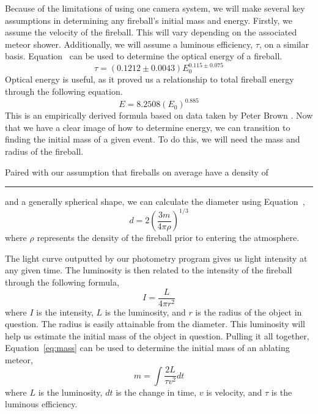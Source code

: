 Because of the limitations of using one camera system, we will make several key assumptions in determining any fireball's initial mass and energy.  
Firstly, we assume the velocity of the fireball.
This will vary depending on the associated meteor shower.
Additionally, we will assume a luminous efficiency, $\tau$, on a similar basis.
Equation~ can be used to determine the optical energy of a fireball.
$$
\tau = (0.1212 \pm 0.0043)E_0^{0.115 \pm 0.075}
$$
Optical energy is useful, as it proved us a relationship to total fireball energy through the following equation.
$$ E = 8.2508(E_0)^{0.885}$$
This is an empirically derived formula based on data taken by Peter Brown \cite{brown_p_flux_2002}.
Now that we have a clear image of how to determine energy, we can transition to finding the initial mass of a given event.
To do this, we will need the mass and radius of the fireball.

Paired with our assumption that fireballs on average have a density of \rule{1cm}{.1pt} and a generally spherical shape, we can calculate the diameter using Equation~,
$$d = 2(\frac{3m}{4\pi \rho})^{1/3}$$
where $\rho$ represents the density of the fireball prior to entering the atmosphere.


The light curve outputted by our photometry program gives us light intensity at any given time.
The luminosity is then related to the intensity of the fireball through the following formula,
$$ I = \frac{L}{4 \pi r^2}$$
where $I$ is the intensity, $L$ is the luminosity, and $r$ is the radius of the object in question.  
The radius is easily attainable from the diameter.
This luminosity will help us estimate the initial mass of the object in question.
Pulling it all together, Equation~\ref{eq:mass} can be used to determine the initial mass of an ablating meteor,
\begin{equation}
m = \int \frac{2L}{\tau v^2} dt
\label{eq:mass}
\end{equation}
where $L$ is the luminosity, $dt$ is the change in time, $v$ is velocity, and $\tau$ is the luminous efficiency. 


